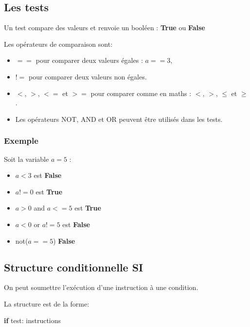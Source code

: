 \documentclass[11pt]{article}
\providecommand{\tightlist}{%
      \setlength{\itemsep}{0pt}\setlength{\parskip}{0pt}}
\newenvironment{Shaded}{}{}
\newcommand{\NormalTok}[1]{{#1}}
\newcommand{\ControlFlowTok}[1]{\textcolor[rgb]{0.00,0.44,0.13}{\textbf{{#1}}}}
\begin{document}
\hypertarget{les-tests}{%
\subsection{Les tests}\label{les-tests}}

Un test compare des valeurs et renvoie un booléen : \textbf{True} ou
\textbf{False}

Les opérateurs de comparaison sont:

\begin{itemize}
\tightlist
\item
  \(==\) pour comparer deux valeurs égales : \(a==3\),
\item
  \(!=\) pour comparer deux valeurs non égales.
\item
  \(<\), \(>\), \(<=\) et \(>=\) pour comparer comme en maths : \(<\),
  \(>\), \(\leqslant\) et \(\geqslant\).
\item
  Les opérateurs NOT, AND et OR peuvent être utilisés dans les tests.
\end{itemize}

\hypertarget{exemple}{%
\subsubsection*{Exemple}\label{exemple}}

Soit la variable \(a=5\) :

\begin{itemize}
\tightlist
\item
  \(a<3\) est \textbf{False}
\item
  \(a!=0\) est \textbf{True}
\item
  \(a>0\) and \(a<=5\) est \textbf{True}
\item
  \(a<0\) or \(a!=5\) est \textbf{False}
\item
  not(\(a==5\)) \textbf{False}
\end{itemize}

\hypertarget{structure-conditionnelle-si}{%
\subsection{Structure conditionnelle
SI}\label{structure-conditionnelle-si}}

On peut soumettre l'exécution d'une instruction à une condition.

La structure est de la forme:

\begin{Shaded}
\begin{Highlighting}[]
\ControlFlowTok{if}\NormalTok{ test:}
\NormalTok{    instructions}
\end{Highlighting}
\end{Shaded}
\end{document}

